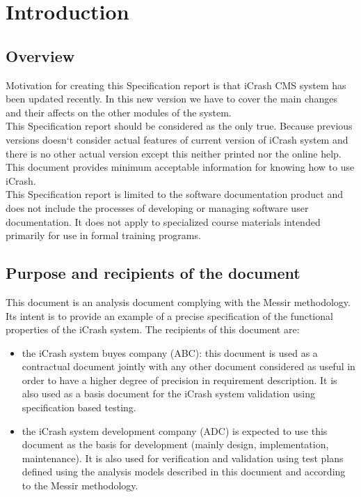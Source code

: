 
\chapter{Introduction}
\label{chap:introduction}

\section{Overview}
Motivation for creating this Specification report is that iCrash CMS system has
been updated recently. In this new version we have to cover the main changes and
their affects on the other modules of the system.\\
This Specification report should be considered as the only true. Because
previous versions doesn`t consider actual features of current version of iCrash
system and there is no other actual version except this neither printed nor the
online help. This document provides minimum acceptable information for knowing
how to use iCrash.\\
This Specification report is limited to the software documentation product and
does not include the processes of developing or managing software user
documentation. It does not apply to specialized course materials intended
primarily for use in formal training programs.\\

\section{Purpose and recipients of the document}
This document is an analysis document complying with the Messir methodology. Its
intent is to provide an example of a precise specification of the functional
properties of the iCrash system. The recipients of this document are:
\begin{itemize}
  \item the iCrash system buyes company (ABC): this document is used as a
  contractual document jointly with any other document considered as useful in
  order to have a higher degree of precision in requirement description. It is
  also used as a basis document for the iCrash system validation using
  specification based testing.
  \item the iCrash system development company (ADC) is expected to use this
  document as the basis for development (mainly design, implementation,
  maintenance). It is also used for verification and validation using test plans
  defined using the analysis models described in this document and according to
  the Messir methodology.
\end{itemize}
 
